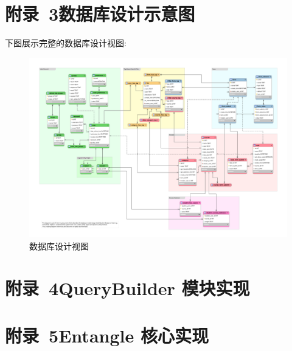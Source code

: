 
\newpage

\section*{附录~3\quad	数据库设计示意图}
\label{sec:appendix-database-diagram}

下图展示完整的数据库设计视图:

\begin{figure}[!h]
  \begin{center}
    \includegraphics[angle=90, scale=0.5]{figures/eer-120dpi.png}
    \caption{数据库设计视图\label{FullDatabaseDesign}}
  \end{center}
\end{figure}

\newpage

\section*{附录~4\quad	QueryBuilder 模块实现}



\newpage

\section*{附录~5\quad	Entangle 核心实现}



